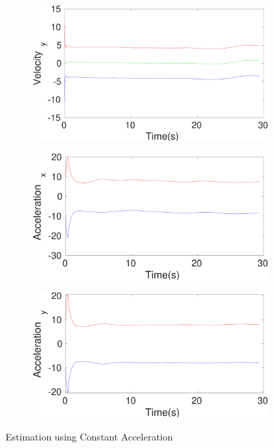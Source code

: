 \begin{figure}[h]
\begin{subfigure}{.5\linewidth}
\end{subfigure}
\begin{subfigure}{.5\linewidth}
\centering
\includegraphics[width=\linewidth]{figures/Frad/s3caSMVelocity_y}
\end{subfigure}
\begin{subfigure}{.5\linewidth}
\centering
\includegraphics[width=\linewidth]{figures/Frad/s3caSMAcceleration_x}
\end{subfigure}
\begin{subfigure}{.5\linewidth}
\centering
\includegraphics[width=\linewidth]{figures/Frad/s3caSMAcceleration_y}
\end{subfigure}
\caption{Estimation using Constant Acceleration}
\end{figure}


